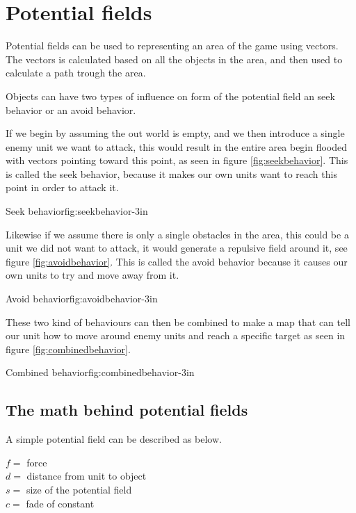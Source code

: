 \section{Potential fields}
	Potential fields can be used to representing an area of the game using vectors.  The vectors is calculated based on all the objects in the area, and then used to calculate a path trough the area.

	Objects can have two types of influence on form of the potential field an seek behavior or an avoid behavior.
	
	If we begin by assuming the out world is empty, and we then introduce a single enemy unit we want to attack, this would result in the entire area begin flooded with vectors pointing toward this point, as seen in figure \ref{fig:seekbehavior}. This is called the seek behavior, because it makes our own units want to reach this point in order to attack it.
	
		{Seek behavior\cite{pft}}{fig:seekbehavior}{-3in}
	
	Likewise if we assume there is only a single obstacles in the area, this could be a unit we did not want to attack, it would generate a repulsive field around it, see figure \ref{fig:avoidbehavior}. This is called the avoid behavior because it causes our own units to try and move away from it.

		{Avoid behavior\cite{pft}}{fig:avoidbehavior}{-3in}
		
	These two kind of behaviours can then be combined to make a map that can tell our unit how to move around enemy units and reach a specific target as seen in figure \ref{fig:combinedbehavior}.
	
		{Combined behavior\cite{pft}}{fig:combinedbehavior}{-3in}
		
	\subsection{The math behind potential fields}
		A simple potential field can be described as below.
		
		$f =$ force\\
		$d =$ distance from unit to object\\
		$s =$ size of the potential field\\
		$c =$ fade of constant\\
	
